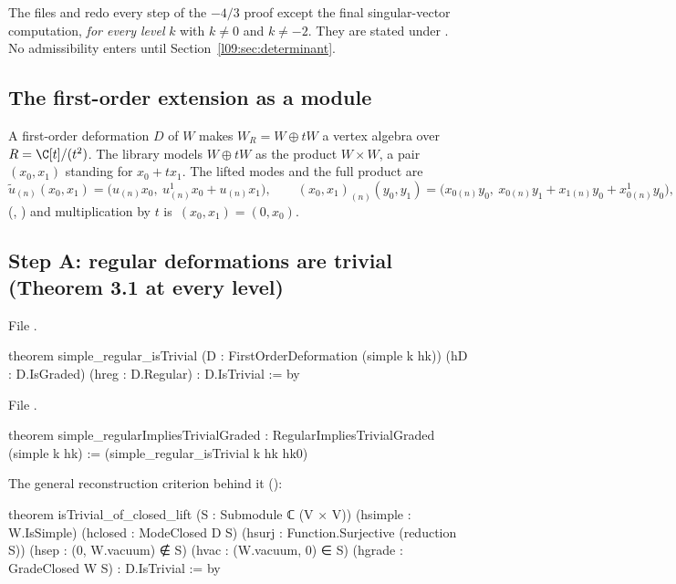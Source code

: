 The files  and  redo every
step of the $-4/3$ proof except the final singular-vector computation, \emph{for every level} $k$ with
$k\ne0$ and $k\ne-2$. They are stated under . No
admissibility enters until Section~\ref{l09:sec:determinant}.

\subsection{The first-order extension as a module}

A first-order deformation $D$ of $W$ makes $W_R = W\oplus tW$ a vertex algebra over $R=\C[t]/(t^2)$. The
library models $W\oplus tW$ as the product $W\times W$, a pair $(x_0,x_1)$ standing for $x_0 + tx_1$. The
lifted modes and the full product are
\begin{equation*}
  \tilde u_{(n)}(x_0,x_1) = \bigl(u_{(n)}x_0,\ u^1_{(n)}x_0 + u_{(n)}x_1\bigr),\qquad
  (x_0,x_1)_{(n)}(y_0,y_1) = \bigl(x_{0(n)}y_0,\ x_{0(n)}y_1 + x_{1(n)}y_0 + x^1_{0(n)}y_0\bigr),
\end{equation*}
(, ) and multiplication by $t$ is
$\,(x_0,x_1) = (0,x_0)$.

\subsection{Step A: regular deformations are trivial (Theorem 3.1 at every level)}

\noindent File .
\begin{leancode}
theorem simple_regular_isTrivial (D : FirstOrderDeformation (simple k hk))
    (hD : D.IsGraded) (hreg : D.Regular) : D.IsTrivial := by
\end{leancode}
\noindent File .
\begin{leancode}
theorem simple_regularImpliesTrivialGraded : RegularImpliesTrivialGraded (simple k hk) :=
  (simple_regular_isTrivial k hk hk0)
\end{leancode}
The general reconstruction criterion behind it ():
\begin{leancode}
theorem isTrivial_of_closed_lift (S : Submodule ℂ (V × V))
    (hsimple : W.IsSimple) (hclosed : ModeClosed D S)
    (hsurj : Function.Surjective (reduction S))
    (hsep : (0, W.vacuum) ∉ S) (hvac : (W.vacuum, 0) ∈ S)
    (hgrade : GradeClosed W S) : D.IsTrivial := by
\end{leancode}

